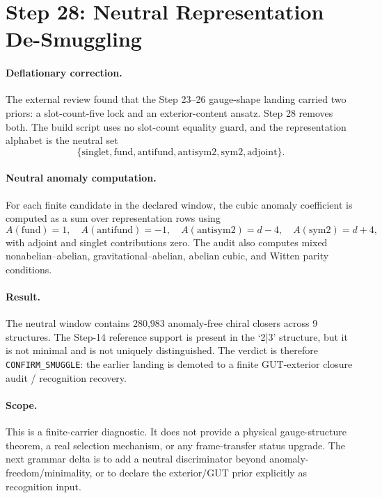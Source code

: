 \section{Step 28: Neutral Representation De-Smuggling}

\paragraph{Deflationary correction.}
The external review found that the Step 23--26 gauge-shape landing carried two priors: a slot-count-five lock and an exterior-content ansatz. Step 28 removes both. The build script uses no slot-count equality guard, and the representation alphabet is the neutral set
\[
\{\mathrm{singlet},\mathrm{fund},\mathrm{antifund},\mathrm{antisym2},\mathrm{sym2},\mathrm{adjoint}\}.
\]

\paragraph{Neutral anomaly computation.}
For each finite candidate in the declared window, the cubic anomaly coefficient is computed as a sum over representation rows using
\[
A(\mathrm{fund})=1,\quad
A(\mathrm{antifund})=-1,\quad
A(\mathrm{antisym2})=d-4,\quad
A(\mathrm{sym2})=d+4,
\]
with adjoint and singlet contributions zero. The audit also computes mixed nonabelian--abelian, gravitational--abelian, abelian cubic, and Witten parity conditions.

\paragraph{Result.}
The neutral window contains 280,983 anomaly-free chiral closers across 9 structures. The Step-14 reference support is present in the `2|3' structure, but it is not minimal and is not uniquely distinguished. The verdict is therefore \texttt{CONFIRM\_SMUGGLE}: the earlier landing is demoted to a finite GUT-exterior closure audit / recognition recovery.

\paragraph{Scope.}
This is a finite-carrier diagnostic. It does not provide a physical gauge-structure theorem, a real selection mechanism, or any frame-transfer status upgrade. The next grammar delta is to add a neutral discriminator beyond anomaly-freedom/minimality, or to declare the exterior/GUT prior explicitly as recognition input.

